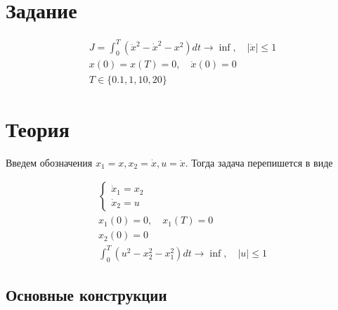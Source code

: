 \documentclass[a4paper,12pt]{article}
\newcommand{\UpdateMe}[1]{\textcolor{red}{#1}}
\newcommand{\University}{Московский государственный университет имени М.~В.~Ломоносова}
\newcommand{\Department}{Кафедра \UpdateMe{НАЗВАНИЕ-КАФЕДРЫ}}
\newcommand{\Student}{\UpdateMe{ИМЯ-СТУДЕНТА}}
\newcommand{\GroupNum}{\UpdateMe{НОМЕР}}
\newcommand{\Seminar}{Численные методы в задачах оптимального управления}
\begin{document}

\section*{Задание}
\begin{gather*}
  J = \int_0^T \left(\ddot{x}^2-\dot{x}^2-x^2\right)dt \rightarrow \inf, \quad \vert\ddot{x}\vert \le 1 \\
  x(0)=x(T)=0,\quad \dot{x}(0) = 0 \\
  T\in\{0.1, 1, 10, 20\}
\end{gather*}

\section{Теория}

Введем обозначения \(x_1=x, x_2=\dot{x}, u=\ddot{x}\). Тогда задача
перепишется в виде

\begin{gather*}
  \begin{cases}
    \dot{x}_1=x_2 \\
    \dot{x}_2=u
  \end{cases} \\
  x_1(0)=0, \quad x_1(T)=0 \\
  x_2(0)=0 \\
  \int_0^T\left(u^2-x_2^2-x_1^2\right)dt \rightarrow \inf, \quad \vert u\vert \le 1
\end{gather*}

\subsection{Основные конструкции}
\end{document}
